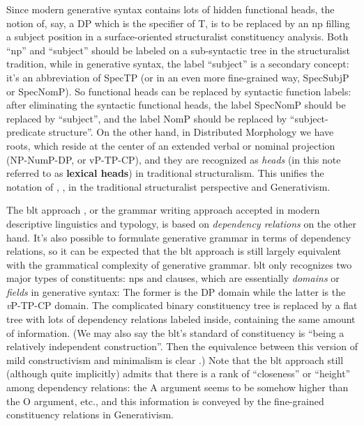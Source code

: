 \documentclass[UTF8, a4paper, oneside, scheme=plain]{ctexrep}
\newcommand*{\concept}[1]{\textbf{#1}}
\newcommand*{\term}[1]{\emph{#1}}
\newcommand{\vP}{\textit{v}P}
\begin{document}
Since modern generative syntax contains lots of hidden functional heads,
the notion of, say, a DP which is the specifier of T,
is to be replaced by an \acs{np} filling a subject position 
in a surface-oriented structuralist constituency analysis. 
Both ``\acs{np}'' and ``subject'' should be labeled on a sub-syntactic tree
in the structuralist tradition,
while in generative syntax,
the label ``subject'' is a secondary concept:
it's an abbreviation of SpecTP (or in an even more fine-grained way, SpecSubjP or SpecNomP).
So functional heads can be replaced by syntactic function labels:
after eliminating the syntactic functional heads, 
the label SpecNomP should be replaced by ``subject'',
and the label NomP should be replaced by ``subject-predicate structure''.
On the other hand,
in Distributed Morphology we have roots,
which reside at the center of an extended verbal or nominal projection
(NP-NumP-DP, or vP-TP-CP),
and they are recognized as \term{heads} 
(in this note referred to as \concept{lexical heads})
in traditional structuralism.
This unifies the notation of
\citet{cgel}, \citet{chao1965grammar}, \citet{zhudexigrammar}
in the traditional structuralist perspective
and Generativism.

The \ac{blt} approach \citep{dixon2009basic}, 
or the grammar writing approach accepted in 
modern descriptive linguistics and typology,
is based on \emph{dependency relations} on the other hand.
It's also possible to formulate generative grammar in terms of dependency relations,
so it can be expected that the \acs{blt} approach is still largely equivalent 
with the grammatical complexity of generative grammar.
\acs{blt} only recognizes two major types of constituents:
\acs{np}s and clauses,
which are essentially \term{domains} or \term{fields} in generative syntax:
The former is the DP domain while the latter is the \vP{}-TP-CP domain.
The complicated binary constituency tree is replaced by a flat tree 
with lots of dependency relations labeled inside,
containing the same amount of information.
(We may also say the \acl{blt}'s standard of constituency 
is ``being a relatively independent construction''. 
Then the equivalence between this version of mild constructivism and minimalism 
is clear \citep{construction-minimalism}.)
Note that the \acl{blt} approach still (although quite implicitly) admits 
that there is a rank of ``closeness'' or ``height'' among dependency relations: 
the A argument seems to be somehow higher than the O argument, etc.,
and this information is conveyed by the fine-grained constituency relations 
in Generativism.
\end{document}
